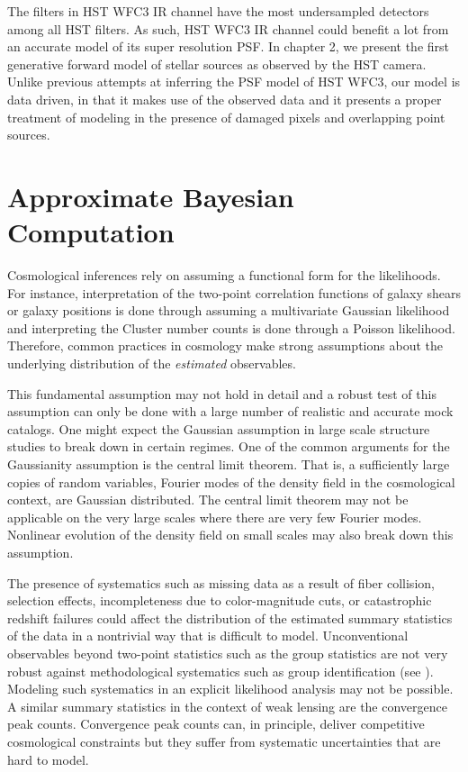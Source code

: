 The filters in HST WFC3 IR channel have the most undersampled detectors among all HST filters. 
As such, HST WFC3 IR channel could benefit a lot from an accurate model of its super resolution PSF. 
In chapter 2, we present the first generative forward model of stellar sources as observed by the HST camera.
Unlike previous attempts at inferring the PSF model of HST WFC3, our model is data driven, in that it makes 
use of the observed data and it presents a proper treatment of modeling in the presence of damaged pixels and overlapping 
point sources. 

\section{Approximate Bayesian Computation}

Cosmological inferences rely on assuming a functional form for the likelihoods. For instance, interpretation of the 
two-point correlation functions of galaxy shears or galaxy positions is done through assuming a multivariate Gaussian likelihood 
and interpreting the Cluster number counts is done through a Poisson likelihood. Therefore, common practices in 
cosmology make strong assumptions about the underlying distribution of the \emph{estimated} observables.

This fundamental assumption may not hold in detail and a robust test of this assumption can only be done with a large 
number of realistic and accurate mock catalogs. One might expect the Gaussian assumption in large scale structure studies 
to break down in certain regimes. One of the common arguments for the Gaussianity assumption is the central limit theorem. That is, a sufficiently large copies 
of random variables, Fourier modes of the density field in the cosmological context, are Gaussian distributed. The central limit theorem may not be applicable on 
the very large scales where there are very few Fourier modes. Nonlinear evolution of the density field on small scales may also break down this assumption. 

The presence of systematics such as missing data as a result of fiber collision, selection effects, incompleteness due to color-magnitude cuts, 
or catastrophic redshift failures \citep{guo2012,Ross:2012aa,Hahn:2017a} could affect the distribution of the estimated summary statistics of the data 
in a nontrivial way that is difficult to model. Unconventional observables beyond two-point statistics such as the group statistics are not very 
robust against methodological systematics such as group identification (see \citealt{groups,campbell2015}). Modeling such systematics in an explicit likelihood analysis may not be possible. A similar summary statistics in the context of weak lensing are the convergence peak counts. Convergence peak counts can, in principle, deliver competitive cosmological constraints but they suffer from systematic uncertainties \citep{abcwl2} that are hard to model. 

